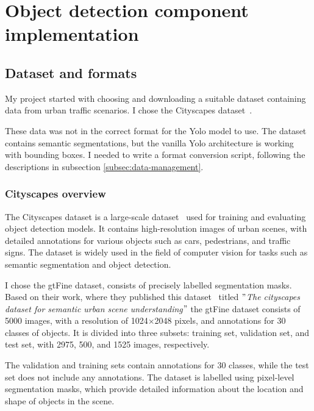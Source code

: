 


\section{Object detection component implementation}\label{sec:object-detection-component-implementation}

\subsection{Dataset and formats}\label{subsec:dataset-and-formats}
My project started with choosing and downloading a suitable dataset containing data from urban traffic scenarios.
I chose the Cityscapes dataset~\cite{Cordts2016Cityscapes}.

These data was not in the correct format for the Yolo model to use.
The dataset contains semantic segmentations, but the vanilla Yolo architecture is working with bounding boxes.
I needed to write a format conversion script, following the descriptions in subsection \ref{subsec:data-management}.


\subsubsection{Cityscapes overview}\label{subsubsec:cityscapes}
The Cityscapes dataset is a large-scale dataset~\cite{Cordts2016Cityscapes} used for training and evaluating object detection models.
It contains high-resolution images of urban scenes, with detailed annotations for various objects such as cars,
pedestrians, and traffic signs.
The dataset is widely used in the field of computer vision for tasks such as semantic segmentation and object detection.


I chose the gtFine dataset, consists of precisely labelled segmentation masks.
Based on their work, where they published this dataset~\cite{Cordts2016Cityscapes} titled \("\)\textit{The cityscapes dataset for semantic urban scene understanding}\("\)
the gtFine dataset consists of 5000 images,
with a resolution of 1024\(\times\)2048 pixels, and annotations for 30 classes of objects.
It is divided into three subsets: training set, validation set, and test set, with 2975, 500, and 1525 images, respectively.

The validation and training sets contain annotations for 30 classes, while the test set does not include any annotations.
The dataset is labelled using pixel-level segmentation masks, which provide detailed information about the
location and shape of objects in the scene.

